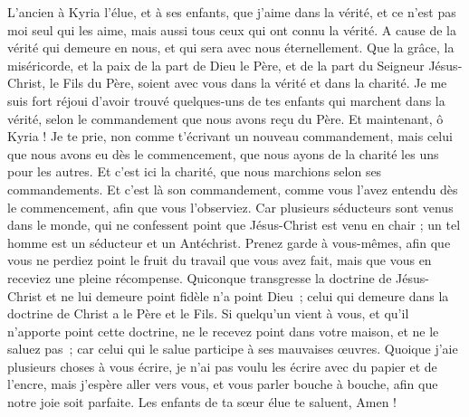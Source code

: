 \BFont
\begin{multicols}{2}
\TextTitle{[Introduction]}
\VerseOne{}L'ancien à Kyria l’élue, et à ses enfants, que j'aime dans la vérité, et ce n’est pas moi seul qui les aime, mais aussi tous ceux qui ont connu la vérité.
A cause de la vérité qui demeure en nous, et qui sera avec nous éternellement.
Que la grâce, la miséricorde, et la paix de la part de Dieu le Père, et de la part du Seigneur Jésus-Christ, le Fils du Père, soient avec vous dans la vérité et dans la charité.
Je me suis fort réjoui d'avoir trouvé quelques-uns de tes enfants qui marchent dans la vérité, selon le commandement que nous avons reçu du Père.
Et maintenant, ô Kyria ! Je te prie, non comme t'écrivant un nouveau commandement, mais celui que nous avons eu dès le commencement, que nous ayons de la charité les uns pour les autres.
Et c'est ici la charité, que nous marchions selon ses commandements. Et c'est là son commandement, comme vous l'avez entendu dès le commencement, afin que vous l'observiez.
Car plusieurs séducteurs sont venus dans le monde, qui ne confessent point que Jésus-Christ est venu en chair ; un tel homme est un séducteur et un Antéchrist.
Prenez garde à vous-mêmes, afin que vous ne perdiez point le fruit du travail que vous avez fait, mais que vous en receviez une pleine récompense.
Quiconque transgresse la doctrine de Jésus-Christ et ne lui demeure point fidèle n'a point Dieu ; celui qui demeure dans la doctrine de Christ a le Père et le Fils.
Si quelqu'un vient à vous, et qu'il n'apporte point cette doctrine, ne le recevez point dans votre maison, et ne le saluez pas ;
car celui qui le salue participe à ses mauvaises œuvres.
\TextTitle{[Conclusion]}
Quoique j’aie plusieurs choses à vous écrire, je n’ai pas voulu les écrire avec du papier et de l'encre, mais j'espère aller vers vous, et vous parler bouche à bouche, afin que notre joie soit parfaite.
Les enfants de ta sœur élue te saluent, Amen !
\PPE{}
\end{multicols}
